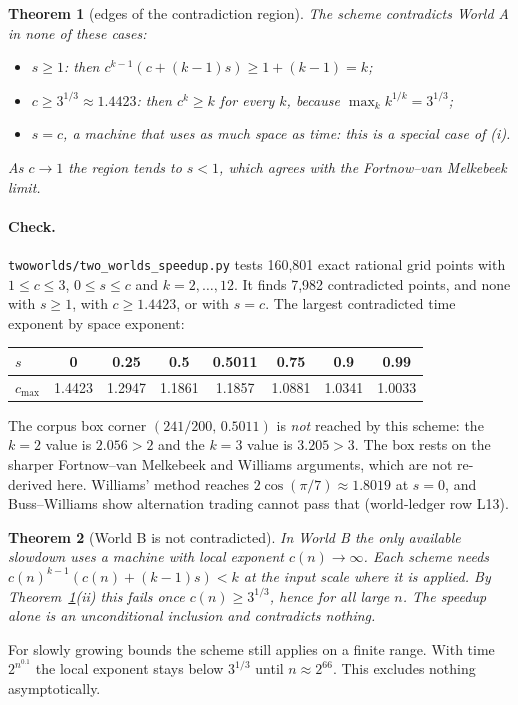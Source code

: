 \documentclass[11pt]{article}
\newtheorem{theorem}{Theorem}
\begin{document}
\begin{theorem}[edges of the contradiction region]\label{thm:edges}
The scheme contradicts World A in none of these cases:
\begin{itemize}
\item[(i)] $s\ge1$: then $c^{k-1}(c+(k-1)s)\ge1+(k-1)=k$;
\item[(ii)] $c\ge3^{1/3}\approx1.4423$: then $c^{k}\ge k$ for every $k$, because $\max_k k^{1/k}=3^{1/3}$;
\item[(iii)] $s=c$, a machine that uses as much space as time: this is a special case of (i).
\end{itemize}
As $c\to1$ the region tends to $s<1$, which agrees with the Fortnow--van Melkebeek limit.
\end{theorem}
\paragraph{Check.} \texttt{twoworlds/two\_worlds\_speedup.py} tests 160{,}801 exact rational grid points with $1\le c\le3$, $0\le s\le c$ and $k=2,\dots,12$. It finds 7{,}982 contradicted points, and none with $s\ge1$, with $c\ge1.4423$, or with $s=c$. The largest contradicted time exponent by space exponent:
\begin{center}
\begin{tabular}{l|ccccccc}
$s$ & 0 & 0.25 & 0.5 & 0.5011 & 0.75 & 0.9 & 0.99\\\hline
$c_{\max}$ & 1.4423 & 1.2947 & 1.1861 & 1.1857 & 1.0881 & 1.0341 & 1.0033
\end{tabular}
\end{center}
The corpus box corner $(241/200,\,0.5011)$ is \emph{not} reached by this scheme: the $k=2$ value is $2.056>2$ and the $k=3$ value is $3.205>3$. The box rests on the sharper Fortnow--van Melkebeek and Williams arguments, which are not re-derived here. Williams' method reaches $2\cos(\pi/7)\approx1.8019$ at $s=0$, and Buss--Williams show alternation trading cannot pass that (world-ledger row L13).

\begin{theorem}[World B is not contradicted]\label{thm:B}
In World B the only available slowdown uses a machine with local exponent $c(n)\to\infty$. Each scheme needs $c(n)^{k-1}(c(n)+(k-1)s)<k$ at the input scale where it is applied. By Theorem~\ref{thm:edges}(ii) this fails once $c(n)\ge3^{1/3}$, hence for all large $n$. The speedup alone is an unconditional inclusion and contradicts nothing.
\end{theorem}
For slowly growing bounds the scheme still applies on a finite range. With time $2^{n^{0.1}}$ the local exponent stays below $3^{1/3}$ until $n\approx2^{66}$. This excludes nothing asymptotically.
\end{document}
